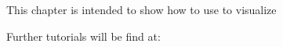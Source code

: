 %
%
%

This chapter is intended to show how to use {\prog} to visualize 

Further tutorials will be find at: 

\centerline{\aplottutorials}

% 

% 


% 